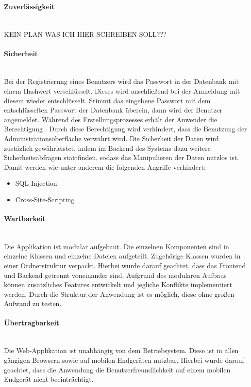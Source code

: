 \paragraph{Zuverlässigkeit}\mbox{} \\
\noindent
KEIN PLAN WAS ICH HIER SCHREIBEN SOLL???

\paragraph{Sicherheit}\mbox{} \\
\noindent
Bei der Registrierung eines Benutzers wird das Passwort in der Datenbank mit einem Hashwert verschlüsselt.
Dieses wird anschließend bei der Anmeldung mit diesem wieder entschlüsselt.
Stimmt das eingebene Passwort mit dem entschlüsselten Passwort der Datenbank überein, dann wird der Benutzer angemeldet.
Während des Erstellungsprozesses erhält der Anwender die Berechtigung .
Durch diese Berechtigung wird verhindert, dass die Benutzung der Administrationsoberfläche verwährt wird.
\newline
\newline
Die Sicherheit der Daten wird zustäzlich gewährleistet, indem im Backend des Systems dazu weitere Sicherheitsabfragen stattfinden, sodass das Manipulieren der Daten nutzlos ist.
Damit werden wie unter anderem die folgenden Angriffe verhindert:
\begin{itemize}
  \item SQL-Injection
  \item Cross-Site-Scripting
\end{itemize}

\paragraph{Wartbarkeit}\mbox{} \\
\noindent
 Die Applikation ist modular aufgebaut.
 Die einzelnen Komponenten sind in einzelne Klassen und einzelne Dateien aufgeteilt.
 Zugehörige Klassen wurden in einer Ordnerstruktur verpackt.
 Hierbei wurde darauf geachtet, dass das Frontend und Backend getrennt voneinander sind.
 Aufgrund des modularen Aufbaus können zusätzliches Features entwickelt und jegliche Konflikte implementiert werden. %
Durch die Struktur der Anwendung ist es möglich, diese ohne großen Aufwand zu testen.

\paragraph{Übertragbarkeit}\mbox{} \\
\noindent
Die Web-Applikation ist unabhängig von dem Betriebsystem.
Diese ist in allen gängigen Browsern sowie auf mobilen Endgeräten nutzbar.
Hierbei wurde darauf geachtet, dass die Anwendung die Benutzerfreundlichkeit auf einem mobilen Endgerät nicht beeinträchtigt.


